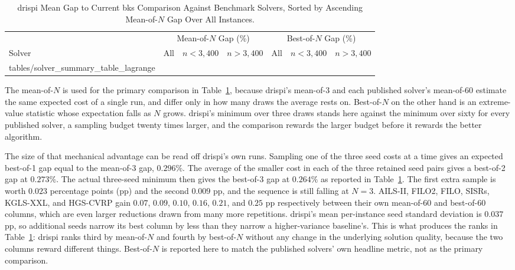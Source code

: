 \begin{table}[!htb]
\centering
\caption{\gls{drispi} Mean Gap to Current \gls{bks} Comparison Against Benchmark Solvers, Sorted by Ascending Mean-of-$N$ Gap Over All Instances.}
\label{tab:solver-summary}
\setlength{\tabcolsep}{3pt}
\makeatletter
\def\solvertablebody{\@@input tables/solver_summary_table_lagrange }
\makeatother
\begin{tabular*}{\linewidth}{@{\extracolsep{\fill}}lrrrrrr@{}}
\toprule
& \multicolumn{3}{c}{Mean-of-$N$ Gap (\%)} & \multicolumn{3}{c}{Best-of-$N$ Gap (\%)} \\
\cmidrule(lr){2-4} \cmidrule(lr){5-7}
Solver & All & $n{<}3{,}400$ & $n{>}3{,}400$ & All & $n{<}3{,}400$ & $n{>}3{,}400$ \\
\midrule
\solvertablebody
\end{tabular*}
\end{table}
The mean-of-$N$ is used for the primary comparison in Table~\ref{tab:solver-summary}, because \gls{drispi}'s mean-of-3 and each published solver's mean-of-60 estimate the same expected cost of a single run, and differ only in how many draws the average rests on. Best-of-$N$ on the other hand is an extreme-value statistic whose
expectation falls as $N$ grows. \gls{drispi}'s minimum over three draws stands
here against the minimum over sixty for every published solver, a sampling budget
twenty times larger, and the comparison rewards the larger budget before it
rewards the better algorithm.

The size of that mechanical advantage can be read off \gls{drispi}'s own runs.
Sampling one of the three seed costs at a time gives an expected best-of-1 gap
equal to the mean-of-3 gap, $0.296\%$. The average of the smaller cost in each
of the three retained seed pairs gives a best-of-2 gap at $0.273\%$. The actual
three-seed minimum then gives the best-of-3 gap at $0.264\%$ as reported in
Table~\ref{tab:solver-summary}. The first extra sample is worth $0.023$
percentage points (pp) and the second $0.009$ pp, and the sequence is still
falling at $N = 3$. AILS-II, FILO2, FILO, SISRs, KGLS-XXL, and HGS-CVRP gain
$0.07$, $0.09$, $0.10$, $0.16$, $0.21$, and $0.25$ pp respectively between
their own mean-of-60 and best-of-60 columns, which are even larger reductions drawn from many
more repetitions. \gls{drispi}'s mean per-instance seed standard deviation is
$0.037$ pp, so additional seeds narrow its best column by less than they narrow
a higher-variance baseline's. This is what produces the ranks in
Table~\ref{tab:solver-summary}: \gls{drispi} ranks third by mean-of-$N$ and fourth
by best-of-$N$ without any change in the underlying solution quality, because
the two columns reward different things. Best-of-$N$ is reported here to match the
published solvers' own headline metric, not as the primary comparison.

